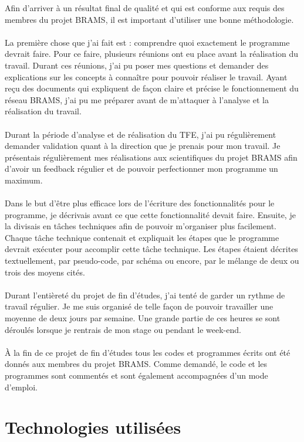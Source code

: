 \documentclass[11pt]{article}
\begin{document}
Afin d'arriver à un résultat final de qualité et qui est conforme aux requis des membres du projet BRAMS, il est important d'utiliser une bonne méthodologie.\\
\\
La première chose que j'ai fait est : comprendre quoi exactement le programme devrait faire.
Pour ce faire, plusieurs réunions ont eu place avant la réalisation du travail.
Durant ces réunions, j'ai pu poser mes questions et demander des explications sur les concepts à connaître pour pouvoir réaliser le travail.
Ayant reçu des documents qui expliquent de façon claire et précise le fonctionnement du réseau BRAMS, j'ai pu me préparer avant de m'attaquer à l'analyse et la réalisation du travail.\\
\\
Durant la période d'analyse et de réalisation du TFE, j'ai pu régulièrement demander validation quant à la direction que je prenais pour mon travail.
Je présentais régulièrement mes réalisations aux scientifiques du projet BRAMS afin d'avoir un feedback régulier et de pouvoir perfectionner mon programme un maximum.\\
\\
Dans le but d'être plus efficace lors de l'écriture des fonctionnalités pour le programme, je décrivais avant ce que cette fonctionnalité devait faire.
Ensuite, je la divisais en tâches techniques afin de pouvoir m'organiser plus facilement.
Chaque tâche technique contenait et expliquait les étapes que le programme devrait exécuter pour accomplir cette tâche technique.
Les étapes étaient décrites textuellement, par pseudo-code, par schéma ou encore, par le mélange de deux ou trois des moyens cités.\\
\\
Durant l'entièreté du projet de fin d'études, j'ai tenté de garder un rythme de travail régulier.
Je me suis organisé de telle façon de pouvoir travailler une moyenne de deux jours par semaine.
Une grande partie de ces heures se sont déroulés lorsque je rentrais de mon stage ou pendant le week-end.\\
\\
À la fin de ce projet de fin d'études tous les codes et programmes écrits ont été donnés aux membres du projet BRAMS.
Comme demandé, le code et les programmes sont commentés et sont également accompagnées d'un mode d'emploi.

\newpage

\section{Technologies utilisées}
\end{document}

